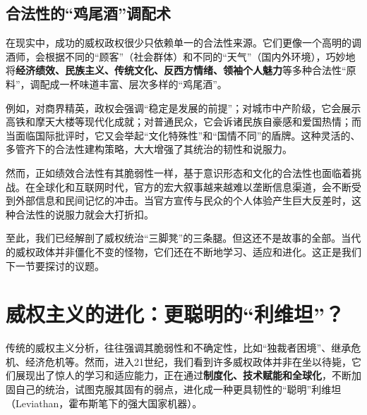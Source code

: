 \subsection{合法性的“鸡尾酒”调配术}

在现实中，成功的威权政权很少只依赖单一的合法性来源。它们更像一个高明的调酒师，会根据不同的“顾客”（社会群体）和不同的“天气”（国内外环境），巧妙地将\textbf{经济绩效、民族主义、传统文化、反西方情绪、领袖个人魅力}等多种合法性“原料”，调配成一杯味道丰富、层次多样的“鸡尾酒”。

例如，对商界精英，政权会强调“稳定是发展的前提”；对城市中产阶级，它会展示高铁和摩天大楼等现代化成就；对普通民众，它会诉诸民族自豪感和爱国热情；而当面临国际批评时，它又会举起“文化特殊性”和“国情不同”的盾牌。这种灵活的、多管齐下的合法性建构策略，大大增强了其统治的韧性和说服力。

然而，正如绩效合法性有其脆弱性一样，基于意识形态和文化的合法性也面临着挑战。在全球化和互联网时代，官方的宏大叙事越来越难以垄断信息渠道，会不断受到外部信息和民间记忆的冲击。当官方宣传与民众的个人体验产生巨大反差时，这种合法性的说服力就会大打折扣。

至此，我们已经解剖了威权统治“三脚凳”的三条腿。但这还不是故事的全部。当代的威权政体并非僵化不变的怪物，它们还在不断地学习、适应和进化。这正是我们下一节要探讨的议题。

\section*{威权主义的进化：更聪明的“利维坦”？}

传统的威权主义分析，往往强调其脆弱性和不确定性，比如“独裁者困境”、继承危机、经济危机等。然而，进入21世纪，我们看到许多威权政体并非在坐以待毙，它们展现出了惊人的学习和适应能力，正在通过\textbf{制度化、技术赋能和全球化}，不断加固自己的统治，试图克服其固有的弱点，进化成一种更具韧性的“聪明”利维坦（Leviathan，霍布斯笔下的强大国家机器）。

